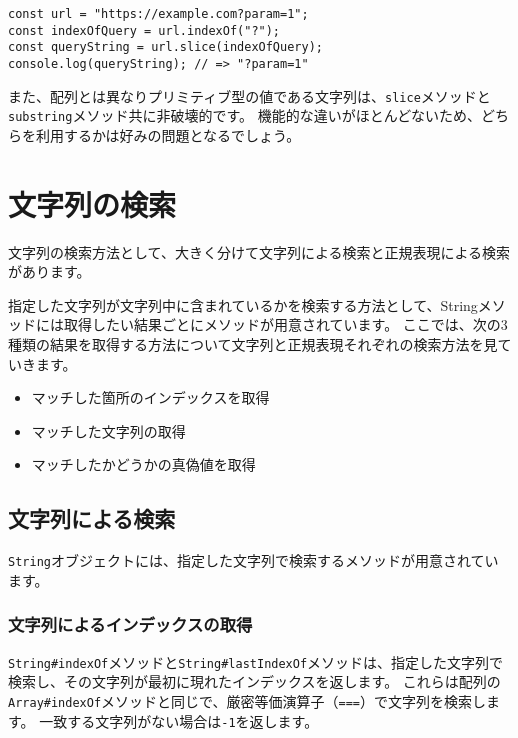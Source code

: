 \begin{lstlisting}
const url = "https://example.com?param=1";
const indexOfQuery = url.indexOf("?");
const queryString = url.slice(indexOfQuery);
console.log(queryString); // => "?param=1"
\end{lstlisting}

また、配列とは異なりプリミティブ型の値である文字列は、\texttt{slice}メソッドと\texttt{substring}メソッド共に非破壊的です。
機能的な違いがほとんどないため、どちらを利用するかは好みの問題となるでしょう。

\hypertarget{search}{%
\section{文字列の検索}\label{search}}

文字列の検索方法として、大きく分けて文字列による検索と正規表現による検索があります。

指定した文字列が文字列中に含まれているかを検索する方法として、Stringメソッドには取得したい結果ごとにメソッドが用意されています。
ここでは、次の3種類の結果を取得する方法について文字列と正規表現それぞれの検索方法を見ていきます。

\begin{itemize}
\item
  マッチした箇所のインデックスを取得
\item
  マッチした文字列の取得
\item
  マッチしたかどうかの真偽値を取得
\end{itemize}

\hypertarget{search-by-string}{%
\subsection{文字列による検索}\label{search-by-string}}

\texttt{String}オブジェクトには、指定した文字列で検索するメソッドが用意されています。

\hypertarget{search-index-by-string}{%
\subsubsection{文字列によるインデックスの取得}\label{search-index-by-string}}

\texttt{String\#indexOf}メソッドと\texttt{String\#lastIndexOf}メソッドは、指定した文字列で検索し、その文字列が最初に現れたインデックスを返します。
これらは配列の\texttt{Array\#indexOf}メソッドと同じで、厳密等価演算子（\texttt{===}）で文字列を検索します。
一致する文字列がない場合は\texttt{-1}を返します。

